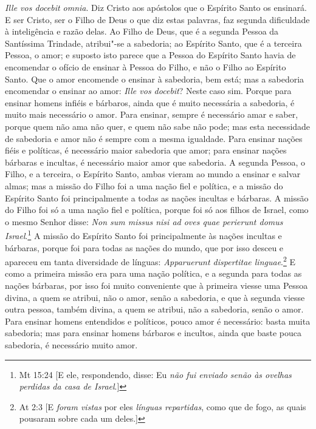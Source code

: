 \emph{Ille vos docebit omnia}. Diz Cristo aos apóstolos que o Espírito
Santo os ensinará. E ser Cristo, ser o Filho de Deus o que diz estas
palavras, faz segunda dificuldade à inteligência e razão delas. Ao Filho
de Deus, que é a segunda Pessoa da Santíssima Trindade, atribui"-se a
sabedoria; ao Espírito Santo, que é a terceira Pessoa, o amor; e suposto
isto parece que a Pessoa do Espírito Santo havia de encomendar o ofício
de ensinar à Pessoa do Filho, e não o Filho ao Espírito Santo. Que o
amor encomende o ensinar à sabedoria, bem está; mas a sabedoria
encomendar o ensinar ao amor: \emph{Ille vos docebit}? Neste caso sim.
Porque para ensinar homens infiéis e bárbaros, ainda que é muito
necessária a sabedoria, é muito mais necessário o amor. Para ensinar,
sempre é necessário amar e saber, porque quem não ama não quer, e quem
não sabe não pode; mas esta necessidade de sabedoria e amor não é sempre
com a mesma igualdade. Para ensinar nações fiéis e políticas, é
necessário maior sabedoria que amor;
para ensinar nações bárbaras e incultas, é necessário maior amor que
sabedoria. A segunda Pessoa, o Filho, e a terceira, o Espírito Santo,
ambas vieram ao mundo a ensinar e salvar almas; mas a missão do Filho
foi a uma nação fiel e política, e a missão do Espírito Santo foi
principalmente a todas as nações incultas e bárbaras. A missão do Filho
foi só a uma nação fiel e política, porque foi só aos filhos de Israel,
como o mesmo Senhor disse: \emph{Non sum missus nisi ad oves quae
perierunt domus Israel}.\footnote{Mt 15:24 [E ele, respondendo, disse: Eu \emph{não fui enviado senão às ovelhas perdidas da casa de Israel}.]} A missão do Espírito Santo foi principalmente
às nações incultas e bárbaras, porque foi para todas as nações do mundo,
que por isso desceu e apareceu em tanta diversidade de línguas:
\emph{Apparuerunt dispertitae linguae}.\footnote{At 2:3 [E \emph{foram vistas} por eles \emph{línguas repartidas}, como que de fogo, as quais pousaram sobre cada um deles.]} E como a primeira missão era
para uma nação política, e a segunda para todas as nações bárbaras, por
isso foi muito conveniente que à primeira viesse uma Pessoa divina, a
quem se atribui, não o amor, senão a sabedoria, e que à segunda viesse
outra pessoa, também divina, a quem se atribui, não a sabedoria, senão o
amor. Para ensinar homens entendidos e políticos, pouco amor é
necessário: basta muita sabedoria; mas para ensinar homens bárbaros e
incultos, ainda que baste pouca sabedoria, é necessário muito amor.

